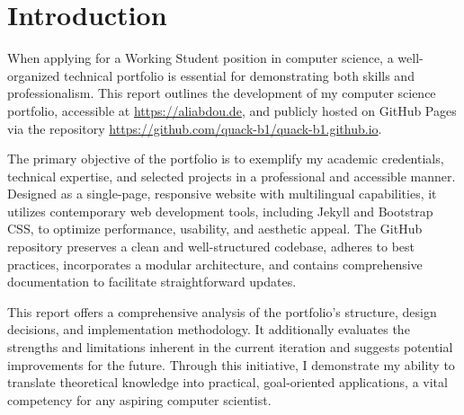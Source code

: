 \chapter{Introduction}
When applying for a Working Student position in computer science, a well-organized technical portfolio is essential for demonstrating both skills and professionalism. This report outlines the development of my computer science portfolio, accessible at \url{https://aliabdou.de}, and publicly hosted on GitHub Pages via the repository \url{https://github.com/quack-b1/quack-b1.github.io}.

The primary objective of the portfolio is to exemplify my academic credentials, technical expertise, and selected projects in a professional and accessible manner. Designed as a single-page, responsive website with multilingual capabilities, it utilizes contemporary web development tools, including Jekyll and Bootstrap CSS, to optimize performance, usability, and aesthetic appeal. The GitHub repository preserves a clean and well-structured codebase, adheres to best practices, incorporates a modular architecture, and contains comprehensive documentation to facilitate straightforward updates.

This report offers a comprehensive analysis of the portfolio's structure, design decisions, and implementation methodology. It additionally evaluates the strengths and limitations inherent in the current iteration and suggests potential improvements for the future. Through this initiative, I demonstrate my ability to translate theoretical knowledge into practical, goal-oriented applications, a vital competency for any aspiring computer scientist. \par